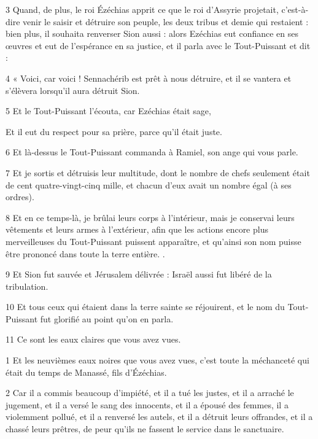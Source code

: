 \par 3 Quand, de plus, le roi Ézéchias apprit ce que le roi d'Assyrie projetait, c'est-à-dire venir le saisir et détruire son peuple, les deux tribus et demie qui restaient : bien plus, il souhaita renverser Sion aussi : alors Ezéchias eut confiance en ses œuvres et eut de l'espérance en sa justice, et il parla avec le Tout-Puissant et dit :

\par 4 « Voici, car voici ! Sennachérib est prêt à nous détruire, et il se vantera et s’élèvera lorsqu’il aura détruit Sion.

\par 5 Et le Tout-Puissant l'écouta, car Ezéchias était sage,

\par Et il eut du respect pour sa prière, parce qu'il était juste.

\par 6 Et là-dessus le Tout-Puissant commanda à Ramiel, son ange qui vous parle.

\par 7 Et je sortis et détruisis leur multitude, dont le nombre de chefs seulement était de cent quatre-vingt-cinq mille, et chacun d'eux avait un nombre égal (à ses ordres).

\par 8 Et en ce temps-là, je brûlai leurs corps à l'intérieur, mais je conservai leurs vêtements et leurs armes à l'extérieur, afin que les actions encore plus merveilleuses du Tout-Puissant puissent apparaître, et qu'ainsi son nom puisse être prononcé dans toute la terre entière. .

\par 9 Et Sion fut sauvée et Jérusalem délivrée : Israël aussi fut libéré de la tribulation.

\par 10 Et tous ceux qui étaient dans la terre sainte se réjouirent, et le nom du Tout-Puissant fut glorifié au point qu'on en parla.

\par 11 Ce sont les eaux claires que vous avez vues.


\par 1 Et les neuvièmes eaux noires que vous avez vues, c'est toute la méchanceté qui était du temps de Manassé, fils d'Ézéchias.

\par 2 Car il a commis beaucoup d'impiété, et il a tué les justes, et il a arraché le jugement, et il a versé le sang des innocents, et il a épousé des femmes, il a violemment pollué, et il a renversé les autels, et il a détruit leurs offrandes, et il a chassé leurs prêtres, de peur qu'ils ne fassent le service dans le sanctuaire.


